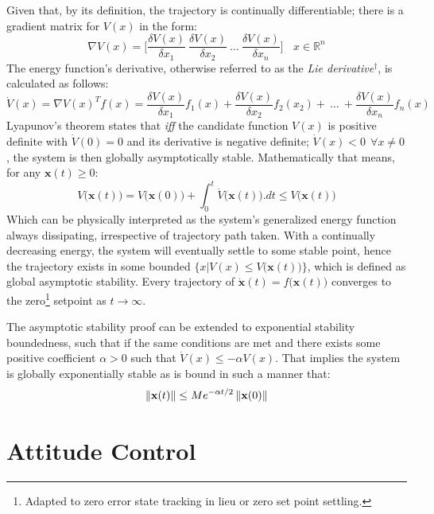 Given that, by its definition, the trajectory is continually differentiable; there is a gradient matrix for $V(x)$ in the form:
\begin{equation}
\nabla V(x)=\bigg[\frac{\delta V(x)}{\delta x_1}~\frac{\delta V(x)}{\delta x_2}~\ldots~\frac{\delta V(x)}{\delta x_n}\bigg]~~~~x\in\mathbb{R}^n
\end{equation}
The energy function's derivative, otherwise referred to as the \emph{Lie derivative}$^\dagger$, is calculated as follows:
\begin{equation}
\dot{V}(x)=\nabla V(x)^Tf(x)=\frac{\delta V(x)}{\delta x_1}f_1(x)+\frac{\delta V(x)}{\delta x_2}f_2(x_2)+~\ldots~+\frac{\delta V(x)}{\delta x_n}f_n(x)
\end{equation}
Lyapunov's theorem states that \emph{iff} the candidate function $V(x)$ is positive definite with $\dot{V}(0)=0$ and its derivative is negative definite; $\dot{V}(x)< 0~~\forall x \not= 0$, the system is then globally asymptotically stable. Mathematically that means, for any $\mathbf{x}(t)\geq 0$:
\begin{equation}
V\big(\mathbf{x}(t)\big)=V\big(\mathbf{x}(0)\big)+\int_0^t \dot{V}\big(\mathbf{x}(t)\big).dt \leq V\big(\mathbf{x}(t)\big)
\end{equation}
Which can be physically interpreted as the system's generalized energy function always dissipating, irrespective of trajectory path taken. With a continually decreasing energy, the system will eventually settle to some stable point, hence the trajectory exists in some bounded $\big\{x|V(x)\leq V\big(\mathbf{x}(t)\big)\big\}$, which is defined as global asymptotic stability. Every trajectory of $\dot{\mathbf{x}}(t)=f\big(\mathbf{x}(t)\big)$ converges to the zero\footnote{Adapted to zero error state tracking in lieu or zero set point settling.} setpoint as $t\rightarrow\infty$.
\par
The asymptotic stability proof can be extended to exponential stability boundedness, such that if the same conditions are met and there exists some positive coefficient $\alpha>0$ such that $\dot{V}(x)\leq-\alpha V(x)$. That implies the system is globally exponentially stable as is bound in such a manner that:
\begin{equation}
\left\lVert\mathbf{x}(t)\right\rVert\leq Me^{-\alpha t/2}\left\lVert\mathbf{x}(0)\right\rVert
\end{equation}
\section{Attitude Control}
\label{sec:control.attitude}
